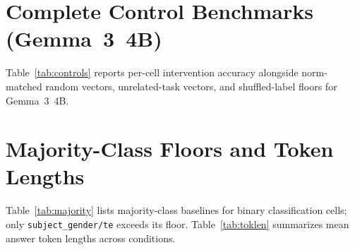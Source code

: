 \documentclass[11pt]{article}
\begin{document}


\appendix

\section{Complete Control Benchmarks (Gemma~3~4B)}
\label{app:controls}

Table~\ref{tab:controls} reports per-cell intervention accuracy alongside
norm-matched random vectors, unrelated-task vectors, and shuffled-label floors
for Gemma~3~4B.

\begin{table}[t]
\centering
\small
\caption{Per-cell function vector accuracy and control benchmarks across tasks
  and conditions (Gemma~3~4B, \texttt{core} tier).}
\label{tab:controls}
\end{table}

\section{Majority-Class Floors and Token Lengths}
\label{app:majority}

Table~\ref{tab:majority} lists majority-class baselines for binary
classification cells; only \texttt{subject\_gender/te} exceeds its floor.
Table~\ref{tab:toklen} summarizes mean answer token lengths across conditions.

\begin{table}[h]
\centering
\small
\caption{Majority-class floors for binary classification tasks (Gemma~3~4B).
  Bold cells fall at or below the floor and are reported as unverified.}
\label{tab:majority}
\end{table}

\begin{table}[h]
\centering
\small
\caption{Mean subword token lengths of gold answers across conditions
  (Gemma~3 tokenizer).}
\label{tab:toklen}
\end{table}
\end{document}
